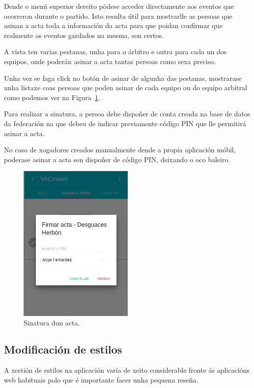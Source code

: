     Dende o menú superior dereito pódese acceder directamente aos eventos que 
ocorreron durante o partido. Isto resulta útil para mostrarlle as persoas que 
asinan a acta toda a información da acta para que poidan confirmar que 
realmente os eventos gardados na mesma, son certos.

    A vista ten varias pestanas, unha para o árbitro e outra para cada un dos 
equipos, onde poderán asinar a acta tantas persoas como sexa preciso.

    Unha vez se faga click no botón de asinar de algunha das pestanas, 
mostrarase unha listaxe coas persoas que poden asinar de cada equipo ou do 
equipo arbitral como podemos ver na Figura~\ref{fig:design:signreport}.

    Para realizar a sinatura, a persoa debe dispoñer de conta creada na base de 
datos da federación na que debeu de indicar previamente código PIN que lle 
permitirá asinar a acta.

    No caso de xogadores creados manualmente dende a propia aplicación móbil, 
poderase asinar a acta sen dispoñer de código PIN, deixando o oco baleiro.
    \clearpage

    \begin{figure}[h!]
      \begin{center}
      \includegraphics[width=0.5\textwidth]{./img/demo/11_sign.png}
      \caption{Sinatura dun acta.}
      \label{fig:design:signreport}
      \end{center}
    \end{figure}

    \subsection{Modificación de estilos}
    A xestión de estilos na aplicación varía de xeito considerable fronte ás 
aplicacións web habituais polo que é importante facer unha pequena reseña.

